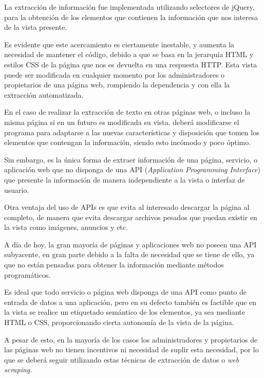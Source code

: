 \lhead{\emph{\ChapterThree{}}}
La extracción de información fue implementada utilizando selectores de jQuery, para la obtención de los elementos que contienen la información que nos interesa de la vista presente.

Es evidente que este acercamiento es ciertamente inestable, y aumenta la necesidad de mantener el código, debido a que se basa en la jerarquía HTML y estilos CSS de la página que nos es devuelta en una respuesta HTTP. Esta vista puede ser modificada en cualquier momento por los administradores o propietarios de una página web, rompiendo la dependencia y con ella la extracción automatizada. 

En el caso de realizar la extracción de texto en otras páginas web, o incluso la misma página si en un futuro es modificada su vista, deberá modificarse el programa para adaptarse a las nuevas características y disposición que tomen los elementos que contengan la información, siendo esto incómodo y poco óptimo.

Sin embargo, es la única forma de extraer información de una página, servicio, o aplicación web que no disponga de una API (\textit{Application Programming Interface}) que presente la información de manera independiente a la vista o interfaz de usuario.

Otra ventaja del uso de APIs es que evita al interesado descargar la página al completo, de manera que evita descargar archivos pesados que puedan existir en la vista como imágenes, anuncios y etc.

%


A día de hoy, la gran mayoría de páginas y aplicaciones web no poseen una API subyacente, en gran parte debido a la falta de necesidad que se tiene de ello, ya que no están pensadas para obtener la información mediante métodos programáticos.

Es ideal que todo servicio o página web disponga de una API como punto de entrada de datos a una aplicación, pero en su defecto también es factible que en la vista se realice un etiquetado semántico de los elementos, ya sea mediante HTML o CSS, proporcionando cierta autonomía de la vista de la página.

A pesar de esto, en la mayoría de los casos los administradores y propietarios de las páginas web no tienen incentivos ni necesidad de suplir esta necesidad, por lo que se deberá seguir utilizando estas técnicas de extracción de datos o \textit{web scraping}.